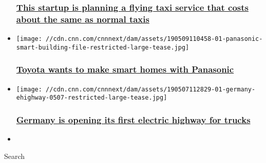 \begin{itemize}
  \hypertarget{this-startup-is-planning-a-flying-taxi-service-that-costs-about-the-same-as-normal-taxis}{%
  \subsubsection{\texorpdfstring{\href{/2019/05/16/tech/lilium-flying-taxi-germany/index.html}{This
  startup is planning a flying taxi service that costs about the same as
  normal
  taxis}}{This startup is planning a flying taxi service that costs about the same as normal taxis}}\label{this-startup-is-planning-a-flying-taxi-service-that-costs-about-the-same-as-normal-taxis}}
\item
  \href{/2019/05/09/tech/toyota-panasonic-smart-homes/index.html}{}

  \texttt{[image: //cdn.cnn.com/cnnnext/dam/assets/190509110458-01-panasonic-smart-building-file-restricted-large-tease.jpg]}

  \hypertarget{toyota-wants-to-make-smart-homes-with-panasonic-}{%
  \subsubsection{\texorpdfstring{\href{/2019/05/09/tech/toyota-panasonic-smart-homes/index.html}{Toyota
  wants to make smart homes with Panasonic
  }}{Toyota wants to make smart homes with Panasonic }}\label{toyota-wants-to-make-smart-homes-with-panasonic-}}
\item
  \href{/2019/05/07/tech/e-highway-a5/index.html}{}

  \texttt{[image: //cdn.cnn.com/cnnnext/dam/assets/190507112829-01-germany-ehighway-0507-restricted-large-tease.jpg]}

  \hypertarget{germany-is-opening-its-first-electric-highway-for-trucks}{%
  \subsubsection{\texorpdfstring{\href{/2019/05/07/tech/e-highway-a5/index.html}{Germany
  is opening its first electric highway for
  trucks}}{Germany is opening its first electric highway for trucks}}\label{germany-is-opening-its-first-electric-highway-for-trucks}}
\item
\end{itemize}

Search

